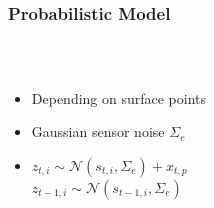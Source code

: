 \begin{frame}
  \frametitle{Probabilistic Model}
  \begin{columns}
  \begin{column}{0.62\textwidth}
  \begin{description}[]
  \item[Measurement points] \hfill \\
  \begin{itemize}
  \item Depending on surface points
  \item Gaussian sensor noise $\Sigma_e$
  \item $z_{t,i} \sim \mathcal{N}(s_{t,i},\Sigma_e) + x_{t,p}$\\
        $z_{t-1,i} \sim \mathcal{N}(s_{t-1,i},\Sigma_e)$
  \end{itemize}
  \end{description}
  \end{column}
  \begin{column}{0.4\textwidth}
  \end{column}
  \end{columns}
\end{frame}

